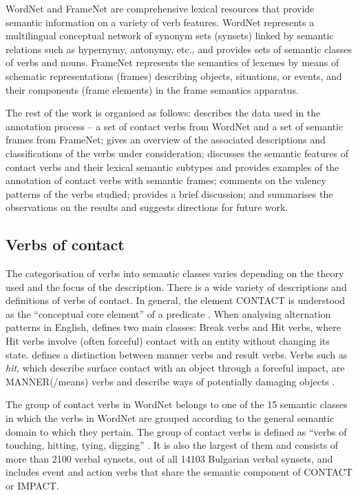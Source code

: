 \documentclass[output=paper,colorlinks,citecolor=brown]{langscibook}
\begin{document}
WordNet and FrameNet are comprehensive lexical resources that provide semantic information on a variety of verb features. WordNet represents a multilingual conceptual network of synonym sets (synsets) linked by semantic relations such as hypernymy, antonymy, etc., and provides sets of semantic classes of verbs and nouns.
FrameNet represents the semantics of lexemes by means of schematic representations (frames) describing objects, situations, or events, and their components (frame elements) in the frame semantics apparatus.

The rest of the work is organised as follows:  describes the data used in the annotation process – a set of contact verbs from WordNet and a set of semantic frames from FrameNet;  gives an overview of the associated descriptions and classifications of the verbs under consideration;  discusses the semantic features of contact verbs and their lexical semantic subtypes and provides examples of the annotation of contact verbs with semantic frames;  comments on the valency patterns of the verbs studied;  provides a brief discussion; and  summarises the observations on the results and suggests directions for future work.

\subsection{Verbs of contact} 
The categorisation of verbs into semantic classes varies depending on the theory used and the focus of the description. There is a wide variety of descriptions and definitions of verbs of contact. In general, the element CONTACT is understood as the “conceptual core element” of a predicate \citep [47]{Juffs:96}. When analysing alternation patterns in English, \citet [125]{Fillmore1977} defines two main classes: Break verbs and Hit verbs, where Hit verbs involve (often forceful) contact with an entity without changing its state. \citet{Levin:93} defines a distinction between manner verbs and result verbs. Verbs such as \textit{hit}, which describe surface contact with an object through a forceful impact, are MANNER(/means) verbs and describe ways of potentially damaging objects \citep{Levin2015}.

The group of contact verbs in WordNet belongs to one of the 15 semantic classes in which the verbs in WordNet are grouped according to the general semantic domain to which they pertain. The group of contact verbs is defined as “verbs of touching, hitting, tying, digging” \citep{Miller1995, Fellbaum:90}. It is also the largest of them and consists of more than 2100 verbal synsets, out of all 14103 Bulgarian verbal synsets, and includes event and action verbs that share the semantic component of CONTACT or IMPACT.
\end{document}
